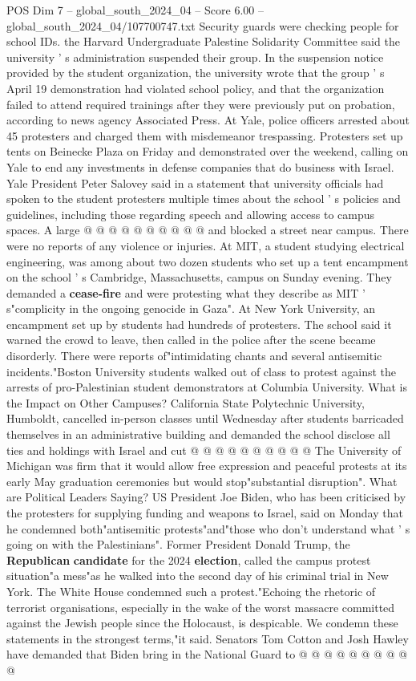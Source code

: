 \begin{textsample}{POS Dim 7 – global\_south\_2024\_04 – Score 6.00 – global\_south\_2024\_04/107700747.txt}
Security guards were checking people for school IDs. the Harvard Undergraduate Palestine Solidarity Committee said the university ' s administration suspended their group.
In the suspension notice provided by the student organization, the university wrote that the group ' s April 19 demonstration had violated school policy, and that the organization failed to attend required trainings after they were previously put on probation, according to news agency Associated Press.
At Yale, police officers arrested about 45 protesters and charged them with misdemeanor trespassing.
Protesters set up tents on Beinecke Plaza on Friday and demonstrated over the weekend, calling on Yale to end any investments in defense companies that do business with Israel.
Yale President Peter Salovey said in a statement that university officials had spoken to the student protesters multiple times about the school ' s policies and guidelines, including those regarding speech and allowing access to campus spaces.
A large @ @ @ @ @ @ @ @ @ @ and blocked a street near campus.
There were no reports of any violence or injuries.
At MIT, a student studying electrical engineering, was among about two dozen students who set up a tent encampment on the school ' s Cambridge, Massachusetts, campus on Sunday evening.
They demanded a \textbf{cease-fire} and were protesting what they describe as MIT ' s"complicity in the ongoing genocide in Gaza".
At New York University, an encampment set up by students had hundreds of protesters.
The school said it warned the crowd to leave, then called in the police after the scene became disorderly.
There were reports of"intimidating chants and several antisemitic incidents."Boston University students walked out of class to protest against the arrests of pro-Palestinian student demonstrators at Columbia University.
What is the Impact on Other Campuses?
California State Polytechnic University, Humboldt, cancelled in-person classes until Wednesday after students barricaded themselves in an administrative building and demanded the school disclose all ties and holdings with Israel and cut @ @ @ @ @ @ @ @ @ @ The University of Michigan was firm that it would allow free expression and peaceful protests at its early May graduation ceremonies but would stop"substantial disruption".
What are Political Leaders Saying?
US President Joe Biden, who has been criticised by the protesters for supplying funding and weapons to Israel, said on Monday that he condemned both"antisemitic protests"and"those who don't understand what ' s going on with the Palestinians".
Former President Donald Trump, the \textbf{Republican} \textbf{candidate} for the 2024 \textbf{election}, called the campus protest situation"a mess"as he walked into the second day of his criminal trial in New York.
The White House condemned such a protest."Echoing the rhetoric of terrorist organisations, especially in the wake of the worst massacre committed against the Jewish people since the Holocaust, is despicable.
We condemn these statements in the strongest terms,"it said.
Senators Tom Cotton and Josh Hawley have demanded that Biden bring in the National Guard to @ @ @ @ @ @ @ @ @ @


\end{textsample}
